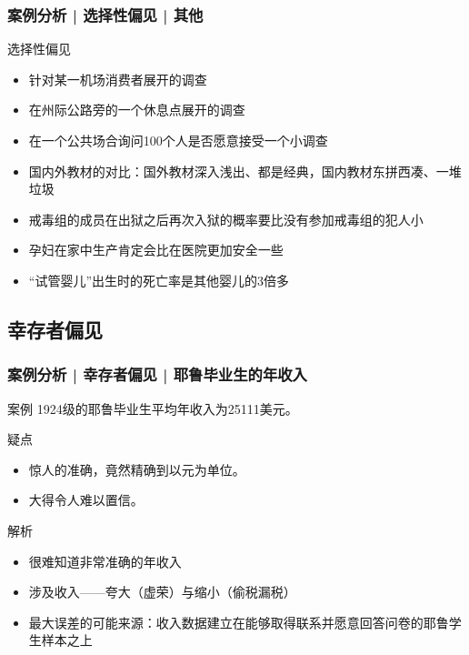 \begin{frame}
  \frametitle{案例分析 | 选择性偏见 | 其他}
  \begin{block}{选择性偏见}
    \begin{itemize}
      \item 针对某一机场消费者展开的调查
      \item 在州际公路旁的一个休息点展开的调查
      \item 在一个公共场合询问100个人是否愿意接受一个小调查
      \item 国内外教材的对比：国外教材深入浅出、都是经典，国内教材东拼西凑、一堆垃圾
      \item 戒毒组的成员在出狱之后再次入狱的概率要比没有参加戒毒组的犯人小
      \item 孕妇在家中生产肯定会比在医院更加安全一些
      \item “试管婴儿”出生时的死亡率是其他婴儿的3倍多
    \end{itemize}
  \end{block}
\end{frame}


\subsection{幸存者偏见}


\begin{frame}
  \frametitle{案例分析 | 幸存者偏见 | 耶鲁毕业生的年收入}
  \begin{block}{案例}
    1924级的耶鲁毕业生平均年收入为25111美元。
  \end{block}
  \pause \pause \pause \pause
  \begin{block}{疑点}
    \begin{itemize}
      \item 惊人的准确，竟然精确到以元为单位。
      \item 大得令人难以置信。
    \end{itemize}
  \end{block}
  \pause
  \begin{block}{解析}
    \begin{itemize}
      \item 很难知道非常准确的年收入
      \item 涉及收入——夸大（虚荣）与缩小（偷税漏税）
      \item 最大误差的可能来源：收入数据建立在能够取得联系并愿意回答问卷的耶鲁学生样本之上
    \end{itemize}
  \end{block}
\end{frame}

